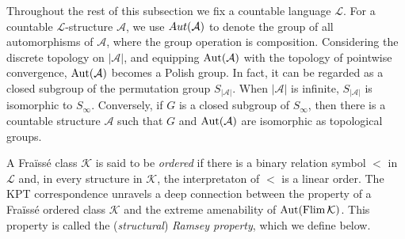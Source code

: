 \documentclass{amsart}
\theoremstyle{definition}
\theoremstyle{remark}
\begin{document}
Throughout the rest of this subsection we fix a countable language $\mathcal{L}$. For a countable $\mathcal{L}$-structure $\mathcal{A}$, we use ${\rm Aut}(\mathcal{A})$ to denote the group of all automorphisms of $\mathcal{A}$, where the group operation is composition. Considering the discrete topology on $|\mathcal{A}|$, and equipping $\mbox{\rm Aut}(\mathcal{A})$ with the topology of pointwise convergence, $\mbox{\rm Aut}(\mathcal{A})$ becomes a Polish group. In fact, it can be regarded as a closed subgroup of the permutation group $S_{|\mathcal{A}|}$. When $|\mathcal{A}|$ is infinite, $S_{|\mathcal{A}|}$ is isomorphic to $S_{\infty}$. Conversely, if $G$ is a closed subgroup of $S_{\infty}$, then there is a countable structure $\mathcal{A}$ such that $G$ and $\mbox{\rm Aut}(\mathcal{A})$ are isomorphic as topological groups. 



A Fra\"iss\'e class $\mathcal{K}$ is said to be {\em ordered} if there is a binary relation symbol $<$ in $\mathcal{L}$ and, in every structure in $\mathcal{K}$, the interpretaton of $<$ is a linear order. The KPT correspondence unravels a deep connection between the property of a Fra\"iss\'e ordered class $\mathcal{K}$ and the extreme amenability of $\mbox{\rm Aut}(\mbox{Flim}\,\mathcal{K})$. This property is called the ({\em structural}) {\em Ramsey property}, which we define below.
    
\end{document}
